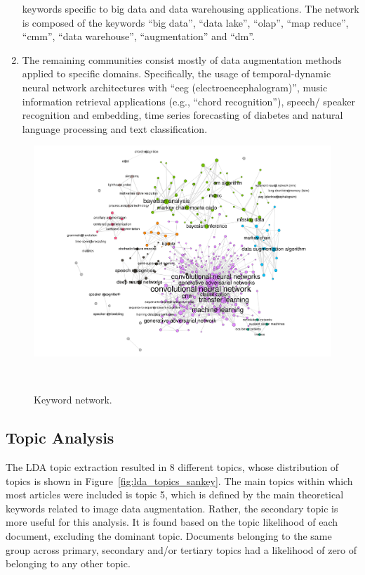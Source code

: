 \documentclass[parskip=full]{scrartcl}
\begin{document}
\begin{enumerate}
        keywords specific to big data and data warehousing applications. The
        network is composed of the keywords ``big data'', ``data lake'',
        ``olap'', ``map reduce'', ``cmm'', ``data warehouse'',
        ``augmentation'' and ``dm''.
    \item The remaining communities consist mostly of data augmentation
        methods applied to specific domains. Specifically, the usage of
        temporal-dynamic neural network architectures with ``eeg
        (electroencephalogram)'', music information retrieval applications
        (e.g., ``chord recognition''), speech/ speaker recognition and
        embedding, time series forecasting of diabetes and natural language
        processing and text classification.
\end{enumerate}

\begin{figure}[H]
	\centering
    \includegraphics[width=\linewidth]{../analysis/keyword_network}
    \caption{Keyword network.
    }~\label{fig:keyword_network}
\end{figure}



\subsection{Topic Analysis}

The LDA topic extraction resulted in 8 different topics, whose distribution of
topics is shown in Figure~\ref{fig:lda_topics_sankey}. The main topics within
which most articles were included is topic 5, which is defined by the main
theoretical keywords related to image data augmentation. Rather, the secondary
topic is more useful for this analysis. It is found based on the topic
likelihood of each document, excluding the dominant topic. Documents belonging
to the same group across primary, secondary and/or tertiary topics had a
likelihood of zero of belonging to any other topic.
\end{document}
